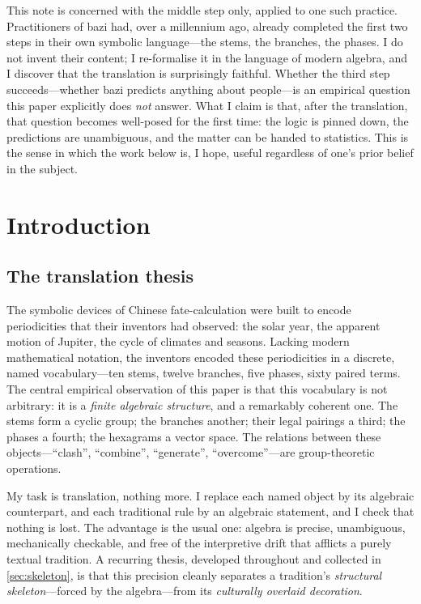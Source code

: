 \documentclass[11pt,a4paper]{article}
\theoremstyle{definition}
\theoremstyle{remark}
\begin{document}
This note is concerned with the middle step only, applied to one such practice. Practitioners of bazi had, over a millennium ago, already completed the first two steps in their own symbolic language---the stems, the branches, the phases. I do not invent their content; I re-formalise it in the language of modern algebra, and I discover that the translation is surprisingly faithful. Whether the third step succeeds---whether bazi predicts anything about people---is an empirical question this paper explicitly does \emph{not} answer. What I claim is that, after the translation, that question becomes well-posed for the first time: the logic is pinned down, the predictions are unambiguous, and the matter can be handed to statistics. This is the sense in which the work below is, I hope, useful regardless of one's prior belief in the subject.

\newpage
\tableofcontents

\newpage
\section{Introduction}

\subsection{The translation thesis}
The symbolic devices of Chinese fate-calculation were built to encode periodicities that their inventors had observed: the solar year, the apparent motion of Jupiter, the cycle of climates and seasons. Lacking modern mathematical notation, the inventors encoded these periodicities in a discrete, named vocabulary---ten stems, twelve branches, five phases, sixty paired terms. The central empirical observation of this paper is that this vocabulary is not arbitrary: it is a \emph{finite algebraic structure}, and a remarkably coherent one. The stems form a cyclic group; the branches another; their legal pairings a third; the phases a fourth; the hexagrams a vector space. The relations between these objects---``clash'', ``combine'', ``generate'', ``overcome''---are group-theoretic operations.

My task is translation, nothing more. I replace each named object by its algebraic counterpart, and each traditional rule by an algebraic statement, and I check that nothing is lost. The advantage is the usual one: algebra is precise, unambiguous, mechanically checkable, and free of the interpretive drift that afflicts a purely textual tradition. A recurring thesis, developed throughout and collected in \cref{sec:skeleton}, is that this precision cleanly separates a tradition's \emph{structural skeleton}---forced by the algebra---from its \emph{culturally overlaid decoration}.
\end{document}
